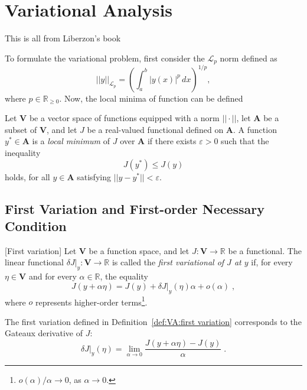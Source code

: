 
\chapter{Variational Analysis}\label{sec:VA}

This is all from Liberzon's book

To formulate the variational problem, first consider the $\mathcal{L}_p$
norm defined as
\begin{equation}\label{eq:lp norm}
	||y||_{\mathcal{L}_p}=\left(\int_a^b |y(x)|^p\,dx\right)^{1/p},
\end{equation}
where $p\in\mathbb{R}_{\geq0}$. Now, the local minima of function can be
defined

\begin{definition}\label{def:VA:local minima}
	Let $\mathbf{V}$ be a vector space of functions equipped with a norm 
	$||\cdot||$, let $\mathbf{A}$ be a subset of $\mathbf{V}$, and let 
	$J$ be a real-valued functional defined on $\mathbf{A}$. A function 
	$y^\ast\in \mathbf{A}$ is a \emph{local minimum} of $J$ over 
	$\mathbf{A}$ if there exists $\varepsilon>0$ such that the inequality
	$$J(y^\ast)\leq J(y)$$
	holds, for all $y\in \mathbf{A}$ satisfying $||y-y^\ast||<\varepsilon$.
\end{definition}

\section{First Variation and First-order Necessary Condition}

\begin{definition}\label{def:VA:first variation}[First variation]
	Let $\mathbf{V}$ be a function space, and let 
	$J:\mathbf{V}\to\mathbb{R}$ be a functional. The linear functional
	$\delta J|_y:\mathbf{V}\to\mathbb{R}$ is called the \emph{first 
	variational of $J$ at $y$} if, for every $\eta\in\mathbf{V}$ and for
	every $\alpha\in\mathbb{R}$, the equality
	\begin{equation}\label{eq:VA:first variational expansion}
		J(y+\alpha\eta) = J(y) + \delta J|_y(\eta)\alpha + o(\alpha)\;,
	\end{equation}
	where $o$ represents higher-order terms\footnote{$o(\alpha)/\alpha\to0$, 
	as $\alpha\to0$.}.
\end{definition}

The first variation defined in Definition~\ref{def:VA:first variation} 
corresponds to the Gateaux derivative of $J$:
\[\delta J|_y(\eta)=\lim_{\alpha\to0}\dfrac{J(y+\alpha\eta)-J(y)}{\alpha}\;.\]

